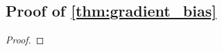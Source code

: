 \subsection{Proof of \cref{thm:gradient_bias}}
\label{proof:gradient_bias}
\begin{proof}







\end{proof}
